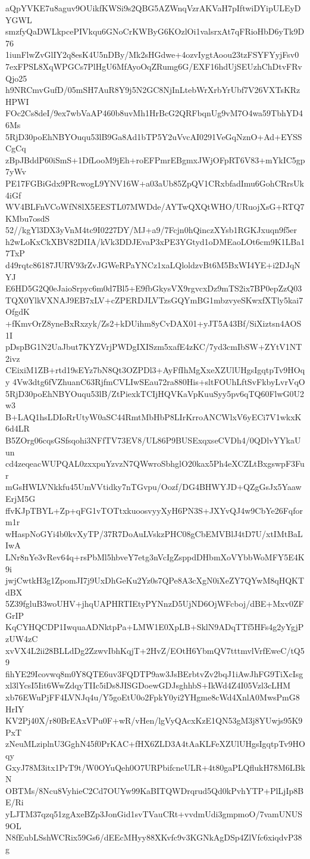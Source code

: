 aQpYVKE7u8aguv9OUikfKWSi9s2QBG5AZWnqVzrAKVaH7pIftwiDYipULEyDYGWL
smzfyQaDWLkpcePIVkqu6GNoCrKWByG6KOzlOi1valsrxAt7qFRioHbD6yTk9D76
1iunFlwZvGlIY2q8esK4U5nDBy/Mk2sHGdwe+4ozvIygtAoou23tzFSYFYyjFsv0
7exFPSL8XqWPGCs7PlHgU6MfAyoOqZRumg6G/EXF16hdUjSEUzhChDtvFRvQjo25
h9NRCmvGufD/05mSH7AuR8Y9j5N2GC8NjInLtebWrXrbYrUbf7V26VXTsKRzHPWI
FOc2Cs8deI/9ex7wbVaAP460b8uvMh1HrBcG2QRFbqnUg9vM7O4wa59TbhYD46Ms
5RjD30poEhNBYOuqu53lB9Ga8Ad1bTP5Y2uVvcAI0291VeGqNznO+Ad+EYSSCgCq
zBpJBddP60iSmS+1DfLooM9jEh+roEFPmrEBgmxJWjOFpRT6V83+mYkIC5gp7yWv
PE17FGBiGdx9PRcwogL9YNV16W+a03aUb85ZpQV1CRxbfadImu6GohCRrsUk4iGf
WV4BLFnVCoWfN8lX5EESTL07MWDde/AYTwQXQtWHO/URuojXsG+RTQ7KMbu7osdS
52//kgYl3DX3yVnM4tc9I0227DY/MJ+a9/7Fcjn0hQinczXYsb1RGKJxuqn9f5er
h2wLoKxCkXBV82DIIA/kVk3DDJEvaP3xPE3YGtyd1oDMEaoLOt6cm9K1LBa17TxP
d49rqtc86187JURV93rZvJGWeRPaYNCz1xaLQloldzvBt6M5BxWI4YE+i2DJqNYJ
E6HD5G2Q0eJaioSrpyc6m0d7Bl5+E9fbGkysVX9rgvcxDz9mTS2ix7BP0epZzQ03
TQX0YlkVXNAJ9EB7xLV+cZPERDJLVTzsGQYmBG1mbzvyeSKwxfXTly5kai7OfgdK
+fKmvOrZ8yneBxRxzyk/Zs2+kDUihm8yCvDAX01+yJT5A43Bf/SiXiztsn4AOS1I
pDspBG1N2UaJbut7KYZVrjPWDgIXISzm5xafE4zKC/7yd3cmIbSW+ZYtV1NT2ivz
CEixiM1ZB+rtd19sEYz7bN8Qt3OZPDl3+AyFfIhMgXxeXZUlUHgsIgqtpTv9HOqy
4Vw3dtg6fVZhuanC63RjfmCVLIwSEau72ra880His+sltFOUhLftSvFkbyLvrVqO
5RjD30poEhNBYOuqu53lB/ZtPiexkTCIjHQVKaVpKuuSyy5pv6qTQ60FlwG0U2w3
B+LAQ1hsLDIoRrUtyW0aSC44RmtMbHbP8LIrKrroANCWlxV6yECi7V1wkxK6d4LR
B5ZOrg06cqsGSfsqohi3NFfTV73EV8/UL86P9BUSExqxseCVDh4/0QDlvYYkaUun
cd4zeqeacWUPQAL0zxxpuYzvzN7QWwroSbhglO20kax5Ph4eXCZLtBxgswpF3Fur
mGsHWLVNkkfu45UmVVtidky7nTGvpu/Oozf/DG4BHWYJD+QZgGsJx5YaawErjM5G
ffvKJpTBYL+Zp+qFG1vTOTtxkuoosvyyXyH6PN3S+JXYvQJ4w9CbYe26Fqform1r
wHaspNoGYi4b0kvXyTP/37R7DoAuLVskzPHC08gCbEMVBlJ4tD7U/xtIMtBaLIwA
LNr8nYe3vRev64q+rsPbMl5hbveY7etg3nVcIgZsppdDHbmXoVYbbWoMFY5E4K9i
jwjCwtkH3g1ZpomJI7j9UxDhGeKu2Yz0s7QPe8A3cXgN0iXeZY7QYwM8qHQKTdBX
5Z39fgluB3woUHV+jhqUAPHRTIEtyPYNnzD5UjND6OjWFcboj/dBE+Mxv0ZFGrIP
KqCYHQCDP1IwquaADNktpPa+LMW1E0XpLB+SklN9ADqTTf5HFs4g2yYgjPzUW4zC
xvVX4L2ii28BLLdDg2ZzwvIbhKqjT+2HvZ/EOtH6YbmQV7tttmvlVrfEweC/tQ59
fihYE29Icovwq8m0Y8QTE6uv3FQDTP9aw3JsBErbtvZv2bqJ1iAwJhFG9TiXcIsg
xl3lYcsI5Iit6WwZdqyTIIc5iDs8JISGDoewGDJsghhbS+IkWd4Z4I05Vzl3cLHM
xb76EWuPjFF4LVNJq4u/Y5goEtU0o2FpkY0yi2YHgme8cWd4XnlA0MwsPmG8HrIY
KV2Pj40X/r80BrEAxVPu0F+wR/vHen/lgVyQAcxKzE1QN53gM3j8YUwjs95K9PxT
zNeuMLziplnU3GghN45f0PrKAC+fHX6ZLD3A4tAaKLFeXZUlUHgsIgqtpTv9HOqy
GxyJ78M3itx1PrT9t/W0OYuQeh0O7URPbifcneULR+4t80gaPLQflukH78M6LBkN
OBTMs/8Ncu8VyhieC2Cd7OUYw99KaBITQWDrqrud5Qd0kPvhYTP+PlLjIp8BE/Ri
yLJTM37qzq51zgAxeBZp3JonGid1svTVauCRt+vvdmUdi3gmpmoO/7vamUNUS9OL
N8fEubLSshWCRix59Gs6/dEEcMHyy88XKvfc9v3KGNkAgDSp4ZlVfc6xiqdvP38g
